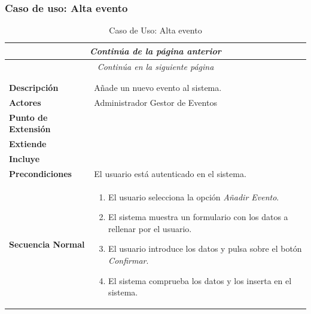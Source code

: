 \newpage
\subsubsection*{Caso de uso: Alta evento }
\begin{longtable}{| p{4cm} | p{10cm} |}
\endfirsthead
\multicolumn{2}{c}{\textit{Continúa de la página anterior}}\\[12pt]
\hline
\endhead
\hline
\multicolumn{2}{c}{\textit{Continúa en la siguiente página}} \\
\endfoot
\hline
\caption{Caso de Uso: Alta evento}\label{fig:1}\\
\endlastfoot


\hline
\multicolumn{2}{|c|}{\textbf{CU$<$39$>$ - Alta Evento}} \\

\hline
\textbf{Descripción} &
Añade un nuevo evento al sistema.\\

\hline
\textbf{Actores} &
Administrador\newline
Gestor de Eventos\\

\hline
\textbf{Punto de Extensión} &
\\

\hline
\textbf{Extiende} &
\\

\hline
\textbf{Incluye} &
\\

\hline
\textbf{Precondiciones} &
El usuario está autenticado en el sistema.\\

\hline
\textbf{Secuencia Normal} &\mbox{}\par\vspace{-\baselineskip}
\begin{enumerate}[leftmargin=0.7cm, topsep=0.1cm]
\item El usuario selecciona la opción \textit{Añadir Evento}.
\item El sistema muestra un formulario con los datos a rellenar por el usuario.
\item El usuario introduce los datos y pulsa sobre el botón \textit{Confirmar}.
\item El sistema comprueba los datos y los inserta en el sistema.
\end{enumerate}



\end{longtable}
